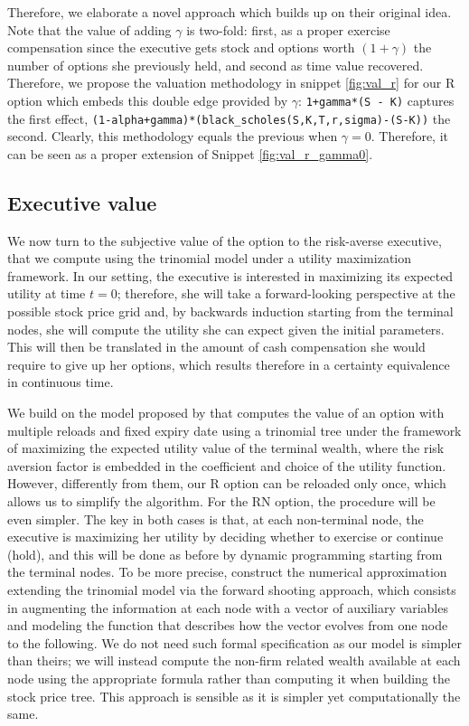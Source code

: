 Therefore, we elaborate a novel approach which builds up on their original idea. Note that the value of adding $\gamma$ is two-fold: first, as a proper exercise compensation since the executive gets stock and options worth $(1+\gamma)$ the number of options she previously held, and second as time value recovered. Therefore, we propose the valuation methodology in snippet \ref*{fig:val_r} for our R option which embeds this double edge provided by $\gamma$: \verb|1+gamma*(S - K)| captures the first effect, \verb|(1-alpha+gamma)*(black_scholes(S,K,T,r,sigma)-(S-K))| the second.
Clearly, this methodology equals the previous when $\gamma = 0$. Therefore, it can be seen as a proper extension of Snippet \ref*{fig:val_r_gamma0}.


\subsection{Executive value}
We now turn to the subjective value of the option to the risk-averse executive, that we compute using the trinomial model under a utility maximization framework. In our setting, the executive is interested in maximizing its expected utility at time $t=0$; therefore, she will take a forward-looking perspective at the possible stock price grid and, by backwards induction starting from the terminal nodes, she will compute the utility she can expect given the initial parameters. This will then be translated in the amount of cash compensation she would require to give up her options, which results therefore in a certainty equivalence in continuous time. 

We build on the model proposed by \citet{lau2005valuation} that computes the value of an option with multiple reloads and fixed expiry date using a trinomial tree under the framework of maximizing the expected utility value of the terminal wealth, where the risk aversion factor is embedded in the coefficient and choice of the utility function. However, differently from them, our R option can be reloaded only once, which allows us to simplify the algorithm. For the RN option, the procedure will be even simpler. The key in both cases is that, at each non-terminal node, the executive is maximizing her utility by deciding whether to exercise or continue (hold), and this will be done as before by dynamic programming starting from the terminal nodes.
To be more precise, \citet{lau2005valuation} construct the numerical approximation extending the trinomial model via the forward shooting approach, which consists in augmenting the information at each node with a vector of auxiliary variables and modeling the function that describes how the vector evolves from one node to the following. We do not need such formal specification as our model is simpler than theirs; we will instead compute the non-firm related wealth available at each node using the appropriate formula rather than computing it when building the stock price tree. This approach is sensible as it is simpler yet computationally the same.

